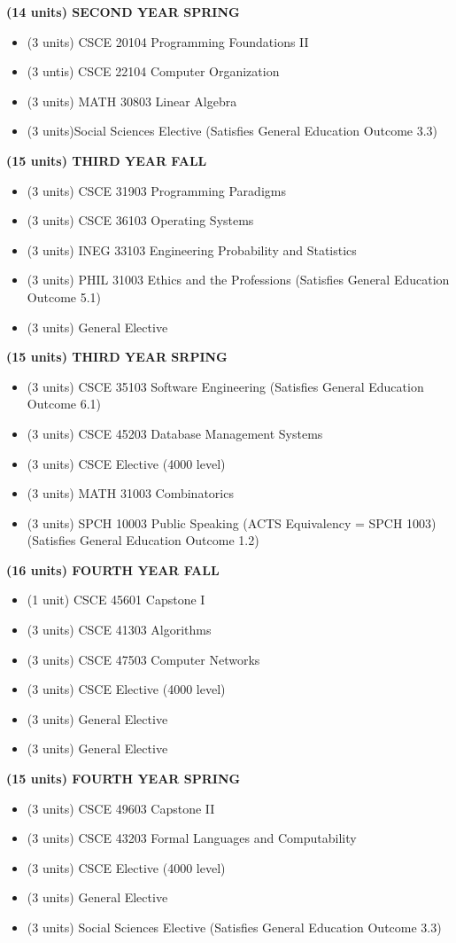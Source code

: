 \documentclass{article}
\begin{document}
\textbf{(14 units) SECOND YEAR SPRING}
	\begin{itemize}
		\item (3 units) CSCE 20104 Programming Foundations II
		\item (3 untis) CSCE 22104 Computer Organization
		\item (3 units) MATH 30803 Linear Algebra
		\item (3 units)Social Sciences Elective (Satisfies General Education Outcome 3.3)
	\end{itemize}

\textbf{(15 units) THIRD YEAR FALL} 
	\begin{itemize}
		\item (3 units) CSCE 31903 Programming Paradigms
		\item (3 units) CSCE 36103 Operating Systems
		\item (3 units) INEG 33103 Engineering Probability and Statistics			
		\item (3 units) PHIL 31003 Ethics and the Professions (Satisfies General Education Outcome 5.1)
		\item (3 units) General Elective
	\end{itemize}

\textbf{(15 units) THIRD YEAR SRPING}
	\begin{itemize}
		\item (3 units) CSCE 35103 Software Engineering (Satisfies General Education Outcome 6.1)
		\item (3 units) CSCE 45203 Database Management Systems
		\item (3 units) CSCE Elective (4000 level)
		\item (3 units) MATH 31003 Combinatorics
		\item (3 units) SPCH 10003 Public Speaking (ACTS Equivalency = SPCH 1003) (Satisfies General Education Outcome 1.2)
	\end{itemize}

\textbf{(16 units) FOURTH YEAR FALL}
	\begin{itemize}
		\item (1 unit) CSCE 45601 Capstone I
		\item (3 units) CSCE 41303 Algorithms
		\item (3 units) CSCE 47503 Computer Networks
		\item (3 units) CSCE Elective (4000 level)
		\item (3 units) General Elective
		\item (3 units) General Elective
	\end{itemize}

\textbf{(15 units) FOURTH YEAR SPRING}
	\begin{itemize}
		\item (3 units) CSCE 49603 Capstone II
		\item (3 units) CSCE 43203 Formal Languages and Computability
		\item (3 units) CSCE Elective (4000 level)
		\item (3 units) General Elective
		\item (3 units) Social Sciences Elective (Satisfies General Education Outcome 3.3)
	\end{itemize}
\end{document}
